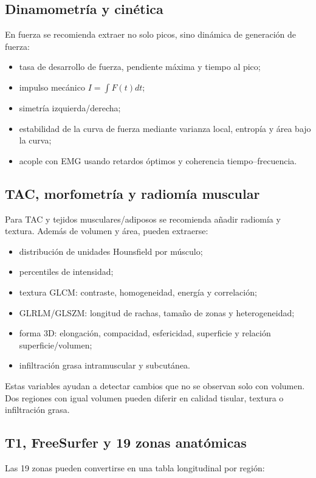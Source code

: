 \documentclass[conference]{IEEEtran}
\begin{document}
\subsection{Dinamometría y cinética}
En fuerza se recomienda extraer no solo picos, sino dinámica de generación de fuerza:

\begin{itemize}[leftmargin=*]
    \item tasa de desarrollo de fuerza, pendiente máxima y tiempo al pico;
    \item impulso mecánico $I=\int F(t)dt$;
    \item simetría izquierda/derecha;
    \item estabilidad de la curva de fuerza mediante varianza local, entropía y área bajo la curva;
    \item acople con EMG usando retardos óptimos y coherencia tiempo--frecuencia.
\end{itemize}

\subsection{TAC, morfometría y radiomía muscular}
Para TAC y tejidos musculares/adiposos se recomienda añadir radiomía y textura. Además de volumen y área, pueden extraerse:

\begin{itemize}[leftmargin=*]
    \item distribución de unidades Hounsfield por músculo;
    \item percentiles de intensidad;
    \item textura GLCM: contraste, homogeneidad, energía y correlación;
    \item GLRLM/GLSZM: longitud de rachas, tamaño de zonas y heterogeneidad;
    \item forma 3D: elongación, compacidad, esfericidad, superficie y relación superficie/volumen;
    \item infiltración grasa intramuscular y subcutánea.
\end{itemize}

Estas variables ayudan a detectar cambios que no se observan solo con volumen. Dos regiones con igual volumen pueden diferir en calidad tisular, textura o infiltración grasa.

\subsection{T1, FreeSurfer y 19 zonas anatómicas}
Las 19 zonas pueden convertirse en una tabla longitudinal por región:
\end{document}
